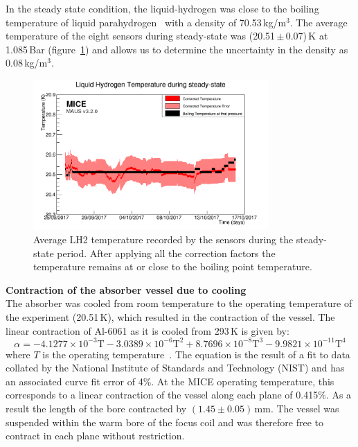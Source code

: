 In the steady state condition, the liquid-hydrogen was close to the
boiling temperature of liquid parahydrogen~\cite{NOTE524} with a
density of 70.53\,kg/m$^{3}$.
The average temperature of the eight sensors during steady-state was
(20.51\,$\mathrm{\pm}$\,0.07)\,K at 1.085\,Bar
(figure~\ref{Fig:TempCalibrated}) and allows us to determine the
uncertainty in the density as 0.08\,kg/m$^{3}$. \\
\begin{figure}
  \begin{center}
    \includegraphics[width=0.80\textwidth]{SteadyState60mK_logo.png}
  \end{center}
  \caption{
    Average LH2 temperature recorded by the sensors during the
    steady-state period.
    After applying all the correction factors the temperature remains
    at or close to the boiling point temperature.
  }
  \label{Fig:TempCalibrated}
\end{figure}
 

\noindent\textbf{Contraction of the absorber vessel due to cooling} \\
\noindent
The absorber was cooled from room temperature to the operating
temperature of the experiment (20.51\,K), which resulted in the
contraction of the vessel.
The linear contraction of Al-6061 as it is cooled from 293\,K is given
by: 
\begin{equation}
  \alpha =-4.1277\times {10}^{-3}\mathrm{T}-3.0389\times {10}^{-6}\mathrm{T}^2+8.7696\times {10}^{-8}\mathrm{T}^3-9.9821\times {10}^{-11}\mathrm{T}^4
\end{equation}
where $T$ is the operating temperature~\cite{Hardin}.
The equation is the result of a fit to data collated by the National
Institute of Standards and Technology (NIST) and has an associated
curve fit error of 4\%. 
At the MICE operating temperature, this corresponds to a linear
contraction of the vessel along each plane of 0.415\%.
As a result the length of the bore contracted by
$(1.45 \pm 0.05)$\,mm.
The vessel was suspended within the warm bore of the focus coil and
was therefore free to contract in each plane without restriction.  \\

